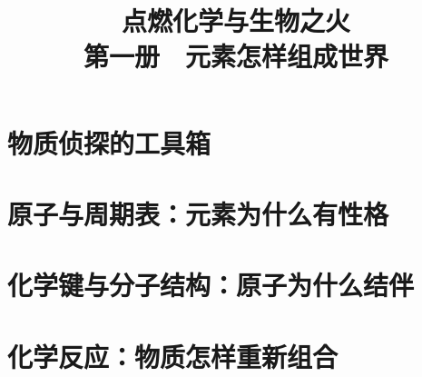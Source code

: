 \documentclass[12pt,openany,fontset=none,UTF8,scheme=chinese]{ctexbook}
\title{点燃化学与生物之火\\第一册　元素怎样组成世界}
\author{}
\date{}
\begin{document}
\frontmatter
\maketitle

\tableofcontents

\mainmatter
\part{物质侦探的工具箱}






\part{原子与周期表：元素为什么有性格}












\part{化学键与分子结构：原子为什么结伴}










\part{化学反应：物质怎样重新组合}











\backmatter
\end{document}
